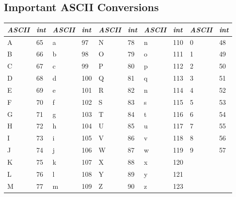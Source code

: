\documentclass[5pt]{article}
\begin{document}
\begin{multicols}{2}
\subsection{Important ASCII Conversions}
\begin{center}
\begin{tabular}{|ll|ll|ll|ll|ll|}
\hline
\tiny{\emph{ASCII}} &  \emph{int} & \tiny{\emph{ASCII}} &  \emph{int} &  \tiny{\emph{ASCII}} &  \emph{int} &  \tiny{\emph{ASCII}} &  \emph{int}&  \tiny{\emph{ASCII}} &  \emph{int}\\
 \hline
A & 65 & a & 97  & N & 78 & n & 110 & 0 & 48 \\
B & 66 & b & 98  & O & 79 & o & 111 & 1 & 49 \\
C & 67 & c & 99  & P & 80 & p & 112 & 2 & 50 \\
D & 68 & d & 100 & Q & 81 & q & 113 & 3 & 51 \\
E & 69 & e & 101 & R & 82 & n & 114 & 4 & 52 \\
F & 70 & f & 102 & S & 83 & s & 115 & 5 & 53 \\
G & 71 & g & 103 & T & 84 & t & 116 & 6 & 54 \\
H & 72 & h & 104 & U & 85 & u & 117 & 7 & 55 \\
I & 73 & i & 105 & V & 86 & v & 118 & 8 & 56 \\
J & 74 & j & 106 & W & 87 & w & 119 & 9 & 57 \\
K & 75 & k & 107 & X & 88 & x & 120 &   &    \\
L & 76 & l & 108 & Y & 89 & y & 121 &   &    \\
M & 77 & m & 109 & Z & 90 & z & 123 &   &    \\
\hline
\end{tabular}
\end{center}

\end{multicols}
\end{document}
